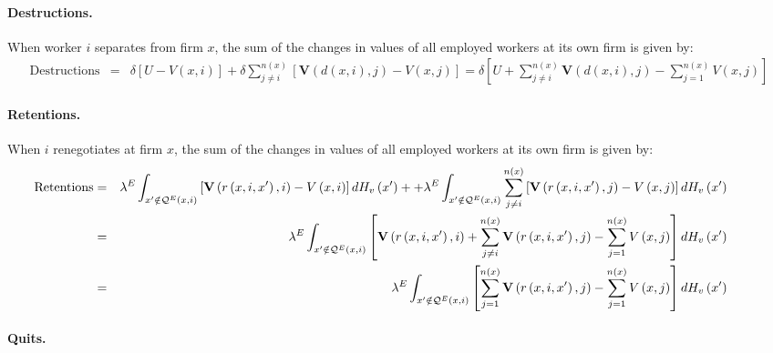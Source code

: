 \paragraph{Destructions.}

When worker $i$ separates from firm $x$, the sum of the changes in values of
all employed workers at its own firm is given by:
\begin{eqnarray*}
\text{Destructions} &=&\delta \left[ U-V\left( x,i\right) \right] +\delta
\sum_{j\neq i}^{n\left( x\right) }\left[ \boldsymbol{V}\left( d(x,i),j\right)
-V\left( x,j\right) \right] =\delta \left[ U+\sum_{j\neq i}^{n\left( x\right) }\boldsymbol{V}\left(
d(x,i),j\right) -\sum_{j=1}^{n\left( x\right) }V\left( x,j\right) \right]
\end{eqnarray*}

\paragraph{Retentions.}

When $i$ renegotiates at firm $x$, the sum of the changes in values of all
employed workers at its own firm is given by:
\begin{eqnarray*}
\hspace*{-1cm}\text{Retentions} &=&\lambda ^{E}\int_{x^{\prime }\notin \mathcal{Q}%
^{E}\left( x,i\right) }\left[ \mathbf{V}\left( r\left( x,i,x^{\prime
}\right) ,i\right) -V\left( x,i\right) \right] dH_v\left( x^{\prime }\right) ++\lambda ^{E}\int_{x^{\prime }\notin \mathcal{Q}^{E}\left( x,i\right)
}\sum_{j\neq i}^{n\left( x\right) }\left[ \mathbf{V}\left( r\left(
x,i,x^{\prime }\right) ,j\right) -V\left( x,j\right) \right] dH_v\left(
x^{\prime }\right) \\
&=&\lambda ^{E}\int_{x^{\prime }\notin \mathcal{Q}^{E}\left( x,i\right) }%
\left[ \mathbf{V}\left( r\left( x,i,x^{\prime }\right) ,i\right)
+\sum_{j\neq i}^{n\left( x\right) }\mathbf{V}\left( r\left( x,i,x^{\prime
}\right) ,j\right) -\sum_{j=1}^{n\left( x\right) }V\left( x,j\right) \right]
dH_v\left( x^{\prime }\right) \\
&=&\lambda ^{E}\int_{x^{\prime }\notin \mathcal{Q}^{E}\left( x,i\right) }%
\left[ \sum_{j=1}^{n\left( x\right) }\mathbf{V}\left( r\left( x,i,x^{\prime
}\right) ,j\right) -\sum_{j=1}^{n\left( x\right) }V\left( x,j\right) \right]
dH_v\left( x^{\prime }\right)
\end{eqnarray*}

\paragraph{Quits.}

